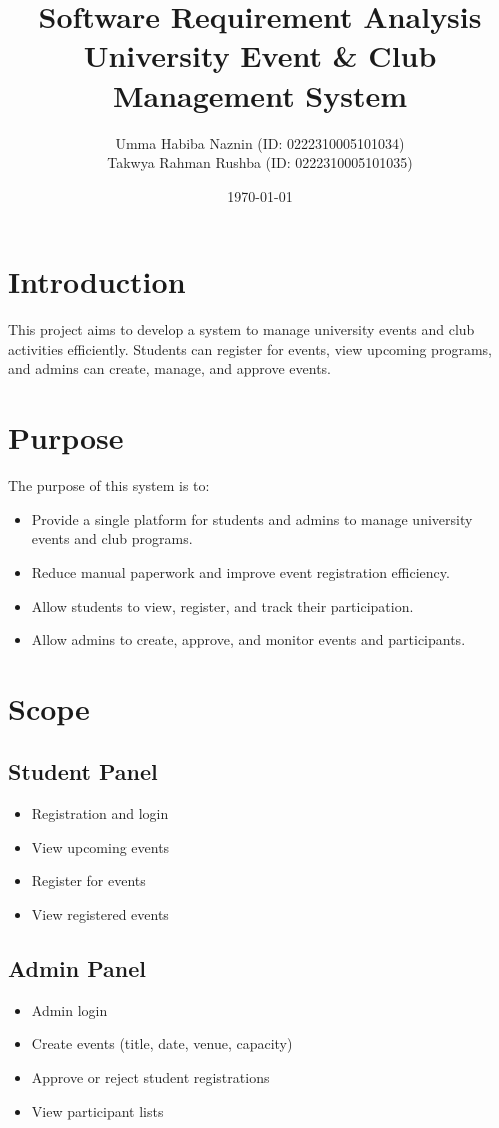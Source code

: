 \documentclass[12pt,a4paper]{article}
\title{Software Requirement Analysis \\ University Event \& Club Management System}
\author{
Umma Habiba Naznin (ID: 0222310005101034) \\
Takwya Rahman Rushba (ID: 0222310005101035)
}
\date{\today}
\begin{document}
\maketitle
\tableofcontents
\newpage

\section{Introduction}
This project aims to develop a system to manage university events and club activities efficiently. Students can register for events, view upcoming programs, and admins can create, manage, and approve events.

\section{Purpose}
The purpose of this system is to:
\begin{itemize}
    \item Provide a single platform for students and admins to manage university events and club programs.
    \item Reduce manual paperwork and improve event registration efficiency.
    \item Allow students to view, register, and track their participation.
    \item Allow admins to create, approve, and monitor events and participants.
\end{itemize}

\section{Scope}
\subsection{Student Panel}
\begin{itemize}
    \item Registration and login
    \item View upcoming events
    \item Register for events
    \item View registered events
\end{itemize}

\subsection{Admin Panel}
\begin{itemize}
    \item Admin login
    \item Create events (title, date, venue, capacity)
    \item Approve or reject student registrations
    \item View participant lists
\end{itemize}
\end{document}
